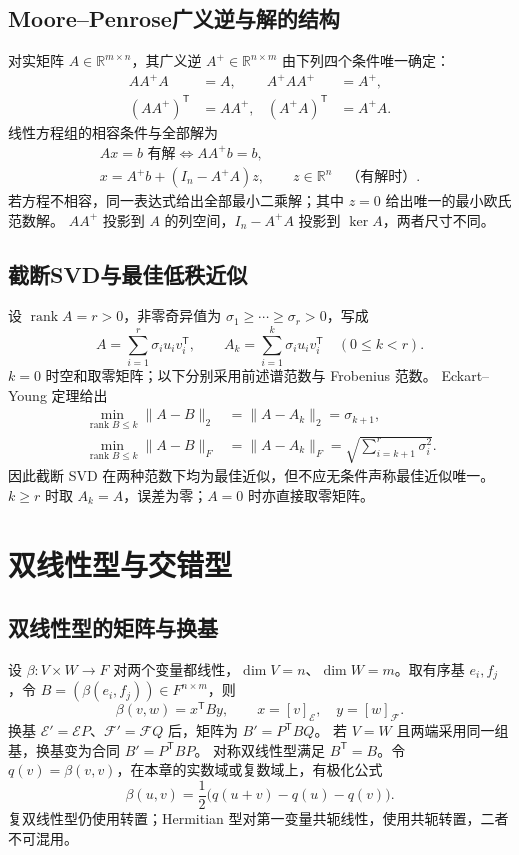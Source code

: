 \documentclass[../main.tex]{subfiles}
\begin{document}
\subsection{Moore--Penrose广义逆与解的结构}
对实矩阵 $A\in\mathbb R^{m\times n}$，其广义逆 $A^+\in\mathbb R^{n\times m}$ 由下列四个条件唯一确定：
\begin{align*}
AA^+A&=A, & A^+AA^+&=A^+,\\
(AA^+)^{\mathsf T}&=AA^+, & (A^+A)^{\mathsf T}&=A^+A.
\end{align*}
线性方程组的相容条件与全部解为
\begin{gather*}
Ax=b\text{ 有解}\iff AA^+b=b,\\
x=A^+b+(I_n-A^+A)z,\qquad z\in\mathbb R^n\quad\text{（有解时）}.
\end{gather*}
若方程不相容，同一表达式给出全部最小二乘解；其中 $z=0$ 给出唯一的最小欧氏范数解。
$AA^+$ 投影到 $A$ 的列空间，$I_n-A^+A$ 投影到 $\ker A$，两者尺寸不同。
\par\pagebreak[0]\begin{samepage}
\subsection{截断SVD与最佳低秩近似}
设 $\operatorname{rank}A=r>0$，非零奇异值为 $\sigma_1\ge\cdots\ge\sigma_r>0$，写成
\[
A=\sum_{i=1}^r\sigma_i u_iv_i^{\mathsf T},\qquad
A_k=\sum_{i=1}^k\sigma_i u_iv_i^{\mathsf T}\quad(0\le k<r).
\]
$k=0$ 时空和取零矩阵；以下分别采用前述谱范数与 Frobenius 范数。
Eckart--Young 定理给出
\begin{align*}
\min_{\operatorname{rank}B\le k}\|A-B\|_2
&=\|A-A_k\|_2=\sigma_{k+1},\\
\min_{\operatorname{rank}B\le k}\|A-B\|_F
&=\|A-A_k\|_F=\sqrt{\sum_{i=k+1}^r\sigma_i^2}.
\end{align*}
因此截断 SVD 在两种范数下均为最佳近似，但不应无条件声称最佳近似唯一。$k\ge r$ 时取 $A_k=A$，误差为零；$A=0$ 时亦直接取零矩阵。
\par\end{samepage}\pagebreak[0]
\section{双线性型与交错型}
\subsection{双线性型的矩阵与换基}
设 $\beta:V\times W\to F$ 对两个变量都线性，$\dim V=n$、$\dim W=m$。取有序基 $e_i,f_j$，令 $B=(\beta(e_i,f_j))\in F^{n\times m}$，则
\[
\beta(v,w)=x^{\mathsf T}By,\qquad x=[v]_{\mathcal E},\quad y=[w]_{\mathcal F}.
\]
换基 $\mathcal E'=\mathcal E P$、$\mathcal F'=\mathcal F Q$ 后，矩阵为 $B'=P^{\mathsf T}BQ$。
若 $V=W$ 且两端采用同一组基，换基变为合同 $B'=P^{\mathsf T}BP$。
对称双线性型满足 $B^{\mathsf T}=B$。令 $q(v)=\beta(v,v)$，在本章的实数域或复数域上，有极化公式
\[
\beta(u,v)=\frac12\bigl(q(u+v)-q(u)-q(v)\bigr).
\]
复双线性型仍使用转置；Hermitian 型对第一变量共轭线性，使用共轭转置，二者不可混用。
\end{document}
